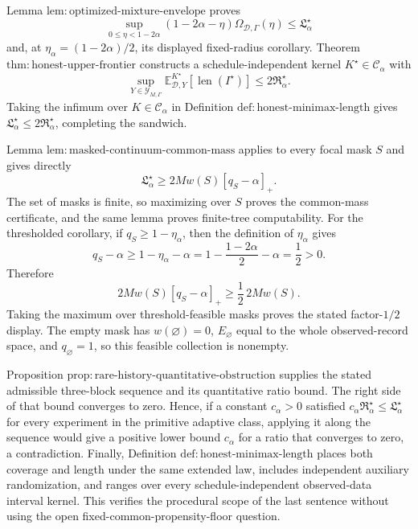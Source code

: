 Lemma \(\mathrm{lem:optimized\text{-}mixture\text{-}envelope}\) proves
\[
 \sup_{0\le\eta<1-2\alpha}
 (1-2\alpha-\eta)\Omega_{\mathcal D,\Gamma}(\eta)
 \le\mathfrak L_\alpha^\star
\]
and, at \(\eta_\alpha=(1-2\alpha)/2\), its displayed fixed-radius corollary.  Theorem \(\mathrm{thm:honest\text{-}upper\text{-}frontier}\) constructs a schedule-independent kernel \(K^\star\in\mathcal C_\alpha\) with
\[
 \sup_{Y\in\mathcal Y_{M,\Gamma}}
 \mathbb E^{K^\star}_{\mathcal D,Y}[\operatorname{len}(I^\star)]
 \le2\mathfrak R_\alpha^\star.
\]
Taking the infimum over \(K\in\mathcal C_\alpha\) in Definition \(\mathrm{def:honest\text{-}minimax\text{-}length}\) gives \(\mathfrak L_\alpha^\star\le2\mathfrak R_\alpha^\star\), completing the sandwich.

Lemma \(\mathrm{lem:masked\text{-}continuum\text{-}common\text{-}mass}\) applies to every focal mask \(S\) and gives directly
\[
 \mathfrak L_\alpha^\star\ge2Mw(S)[q_S-\alpha]_+.
\]
The set of masks is finite, so maximizing over \(S\) proves the common-mass certificate, and the same lemma proves finite-tree computability.  For the thresholded corollary, if \(q_S\ge1-\eta_\alpha\), then the definition of \(\eta_\alpha\) gives
\[
 q_S-\alpha
 \ge1-\eta_\alpha-\alpha
 =1-\frac{1-2\alpha}{2}-\alpha
 =\frac12>0.
\]
Therefore
\[
 2Mw(S)[q_S-\alpha]_+
 \ge\frac12\,2Mw(S).
\]
Taking the maximum over threshold-feasible masks proves the stated factor-\(1/2\) display.  The empty mask has \(w(\varnothing)=0\), \(E_\varnothing\) equal to the whole observed-record space, and \(q_\varnothing=1\), so this feasible collection is nonempty.

Proposition \(\mathrm{prop:rare\text{-}history\text{-}quantitative\text{-}obstruction}\) supplies the stated admissible three-block sequence and its quantitative ratio bound.  The right side of that bound converges to zero.  Hence, if a constant \(c_\alpha>0\) satisfied \(c_\alpha\mathfrak R_\alpha^\star\le\mathfrak L_\alpha^\star\) for every experiment in the primitive adaptive class, applying it along the sequence would give a positive lower bound \(c_\alpha\) for a ratio that converges to zero, a contradiction.  Finally, Definition \(\mathrm{def:honest\text{-}minimax\text{-}length}\) places both coverage and length under the same extended law, includes independent auxiliary randomization, and ranges over every schedule-independent observed-data interval kernel.  This verifies the procedural scope of the last sentence without using the open fixed-common-propensity-floor question.
